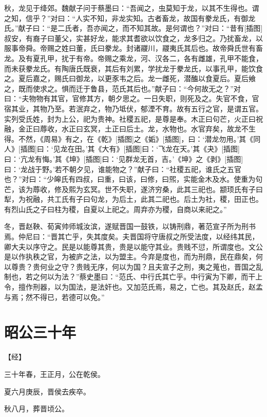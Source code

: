 \documentclass[a4paper,12pt,UTF8,twoside]{ctexbook}
\begin{document}
秋，龙见于绛郊。魏献子问于蔡墨曰：“吾闻之，虫莫知于龙，以其不生得也。谓之知，信乎？”对曰：“人实不知，非龙实知。古者畜龙，故国有豢龙氏，有御龙氏。”献子曰：“是二氏者，吾亦闻之，而不知其故。是何谓也？”对曰：“昔有[插图]叔安，有裔子曰董父，实甚好龙，能求其耆欲以饮食之，龙多归之。乃扰畜龙，以服事帝舜。帝赐之姓曰董，氏曰豢龙。封诸鬷川，鬷夷氏其后也。故帝舜氏世有畜龙。及有夏孔甲，扰于有帝。帝赐之乘龙，河、汉各二，各有雌雄，孔甲不能食，而未获豢龙氏。有陶唐氏既衰，其后有刘累，学扰龙于豢龙氏，以事孔甲，能饮食之。夏后嘉之，赐氏曰御龙，以更豕韦之后。龙一雌死，潜醢以食夏后。夏后飨之，既而使求之。惧而迁于鲁县，范氏其后也。”献子曰：“今何故无之？”对曰：“夫物物有其官，官修其方，朝夕思之。一日失职，则死及之。失官不食，官宿其业，其物乃至。若泯弃之，物乃坻伏，郁湮不育。故有五行之官，是谓五官。实列受氏姓，封为上公，祀为贵神。社稷五祀，是尊是奉。木正曰句芒，火正曰祝融，金正曰蓐收，水正曰玄冥，土正曰后土。龙，水物也。水官弃矣，故龙不生得。不然，《周易》有之，在《乾》[插图]之《姤》[插图]，曰：‘潜龙勿用。’其《同人》[插图]曰：‘见龙在田。’其《大有》[插图]曰：‘飞龙在天。’其《夬》[插图]曰：‘亢龙有悔。’其《坤》[插图]曰：‘见群龙无首，吉。’《坤》之《剥》[插图]曰：‘龙战于野。’若不朝夕见，谁能物之？”献子曰：“社稷五祀，谁氏之五官也？”对曰：“少皞氏有四叔，曰重，曰该，曰修，曰煕，实能金木及水。使重为句芒，该为蓐收，修及熙为玄冥。世不失职，遂济穷桑，此其三祀也。颛顼氏有子曰犁，为祝融，共工氏有子曰句龙，为后土，此其二祀也。后土为社，稷，田正也。有烈山氏之子曰柱为稷，自夏以上祀之。周弃亦为稷，自商以来祀之。”

冬，晋赵鞅、荀寅帅师城汝滨，遂赋晋国一鼓铁，以铸刑鼎，著范宣子所为刑书焉。仲尼曰：“晋其亡乎，失其度矣。夫晋国将守唐叔之所受法度，以经纬其民，卿大夫以序守之。民是以能尊其贵，贵是以能守其业。贵贱不愆，所谓度也。文公是以作执秩之官，为被庐之法，以为盟主。今弃是度也，而为刑鼎，民在鼎矣，何以尊贵？贵何业之守？贵贱无序，何以为国？且夫宣子之刑，夷之蒐也，晋国之乱制也，若之何以为法？”蔡史墨曰：“范氏、中行氏其亡乎。中行寅为下卿，而干上令，擅作刑器，以为国法，是法奸也。又加范氏焉，易之，亡也。其及赵氏，赵孟与焉；然不得已，若德可以免。”


\section{昭公三十年}



【经】

三十年春，王正月，公在乾侯。

夏六月庚辰，晋侯去疾卒。

秋八月，葬晋顷公。
\end{document}
